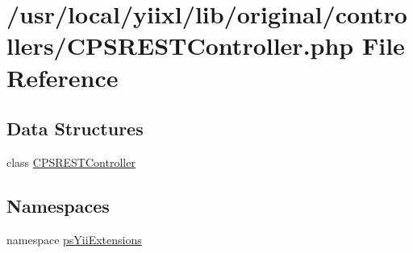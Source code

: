 \hypertarget{CPSRESTController_8php}{
\section{/usr/local/yiixl/lib/original/controllers/CPSRESTController.php File Reference}
\label{CPSRESTController_8php}
}
\subsection*{Data Structures}
\begin{DoxyCompactItemize}
\item 
class \hyperlink{classCPSRESTController}{CPSRESTController}
\end{DoxyCompactItemize}
\subsection*{Namespaces}
\begin{DoxyCompactItemize}
\item 
namespace \hyperlink{namespacepsYiiExtensions}{psYiiExtensions}
\end{DoxyCompactItemize}
